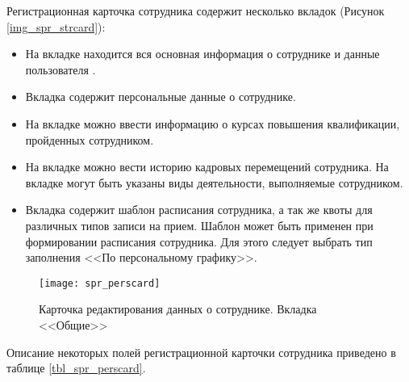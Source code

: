 Регистрационная карточка сотрудника содержит несколько вкладок (Рисунок \ref{img_spr_strcard}):
\begin{itemize}
 \item На вкладке  находится вся основная информация о сотруднике и данные пользователя \tmis.
 \item Вкладка  содержит персональные данные о сотруднике.
 \item На вкладке  можно ввести информацию о курсах повышения квалификации, пройденных сотрудником.
 \item На вкладке  можно вести историю кадровых перемещений сотрудника.
 На вкладке  могут быть указаны виды деятельности, выполняемые сотрудником.
 \item Вкладка  содержит шаблон расписания сотрудника, а так же квоты для различных типов записи на прием. Шаблон может быть применен при формировании расписания сотрудника. Для этого следует выбрать тип заполнения <<По персональному графику>>.
\end{itemize}
 
\begin{figure}[ht!]\centering
 \texttt{[image: spr\_perscard]}
 \caption{Карточка редактирования данных о сотруднике. Вкладка <<Общие>>}
 \label{img_spr_perscard}
\end{figure}

Описание некоторых полей регистрационной карточки сотрудника приведено в таблице \ref{tbl_spr_perscard}.

